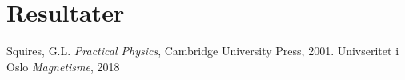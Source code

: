\documentclass[%
 reprint,
 amsmath,amssymb,
 aps,
]{revtex4-1}
\begin{document}
\section{\label{sec:level4}Resultater}

\begin{thebibliography}{9}
Squires, G.L. \emph{Practical Physics}, Cambridge University Press, 2001.
Univseritet i Oslo \emph{Magnetisme}, 2018
\end{thebibliography}
\end{document}
